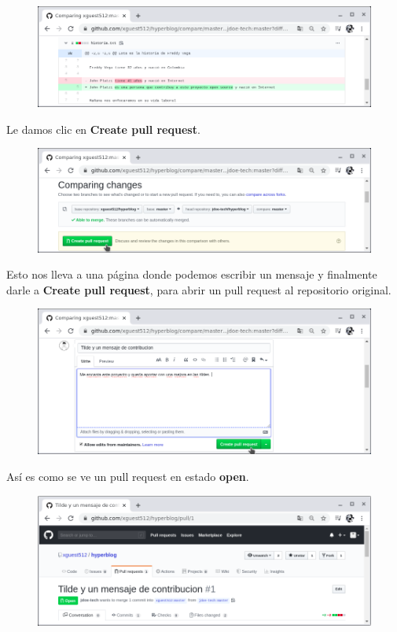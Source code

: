 \documentclass{article}
\begin{document}
\begin{figure}[h!]
  \centering
  \includegraphics[scale=0.75]{./Pictures/316_diferencias.png}
\end{figure}

Le damos clic en \textbf{Create pull request}.

\begin{figure}[h!]
  \centering
  \includegraphics[scale=0.75]{./Pictures/317_create_pr.png}
\end{figure}

Esto nos lleva a una página donde podemos escribir un mensaje y finalmente
darle a \textbf{Create pull request}, para abrir un pull request al repositorio
original.

\begin{figure}[h!]
  \centering
  \includegraphics[scale=0.75]{./Pictures/318_write_pr.png}
\end{figure}

\newpage

Así es como se ve un pull request en estado \textbf{open}.

\begin{figure}[h!]
  \centering
  \includegraphics[scale=0.75]{./Pictures/319_pull_request.png}
\end{figure}
\end{document}
